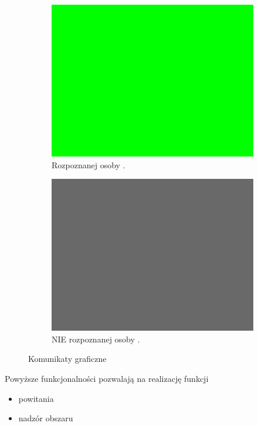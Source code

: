 \documentclass[a4paper,12pt,reqno]{article}
\begin{document}
\begin{figure}[H]%
	\centering
	\begin{subfigure}{.5\textwidth}
		\centering
		\includegraphics[width=0.8\linewidth]{imgs/testy_rozpoznana.jpg}
		\caption{Rozpoznanej osoby \cite{img_me}.}	
		\label{komunikatgraficzny:rozpoznana}
	\end{subfigure}%
	\begin{subfigure}{.5\textwidth}
		\centering
		\includegraphics[width=0.8\linewidth]{imgs/testy_NIErozpoznana.jpg}
		\caption{NIE rozpoznanej osoby \cite{img_me}.}
		\label{komunikatgraficzny:NIErozpoznana}
	\end{subfigure}%
\caption{Komunikaty graficzne}
\label{komunikatgraficzny:komunikatgraficzny}
\end{figure}

Powyższe funkcjonalności pozwalają na realizację funkcji

\begin{itemize}
	\item powitania
	\item nadzór obszaru
\end{itemize}
\end{document}
